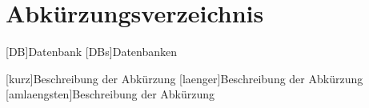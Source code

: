 \chapter{Abkürzungsverzeichnis}

\begin{acronym}[amlaengsten]
    [DB]{Datenbank}
    [DBs]{Datenbanken}
    
    [kurz]{Beschreibung der Abkürzung}
    [laenger]{Beschreibung der Abkürzung}
    [amlaengsten]{Beschreibung der Abkürzung}
\end{acronym}
